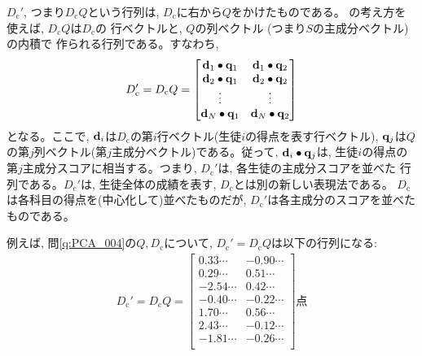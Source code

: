 $D_{\text{c}}'$, つまり$D_{\text{c}}Q$という行列は, 
$D_{\text{c}}$に右から$Q$をかけたものである。
の考え方を使えば, $D_{\text{c}}Q$は$D_{\text{c}}$の
行ベクトルと, $Q$の列ベクトル (つまり$S$の主成分ベクトル)の内積で
作られる行列である。すなわち, 
\begin{eqnarray}
D_{\text{c}}'=D_{\text{c}}Q=\begin{bmatrix}
{\bf d}_1\bullet{\bf q}_1 & {\bf d}_1\bullet{\bf q}_2\\
{\bf d}_2\bullet{\bf q}_1 & {\bf d}_2\bullet{\bf q}_2\\
\vdots & \vdots\\
{\bf d}_N\bullet{\bf q}_1 & {\bf d}_N\bullet{\bf q}_2\\
\end{bmatrix}
\end{eqnarray}
となる。ここで, ${\bf d}_i$は$D_{\text{c}}$の第$i$行ベクトル(生徒$i$の得点を表す行ベクトル), 
${\bf q}_j$は$Q$の第$j$列ベクトル(第$j$主成分ベクトル)である。従って, ${\bf d}_i\bullet{\bf q}_j$は, 
生徒$i$の得点の第$j$主成分スコアに相当する。つまり, $D_{\text{c}}'$は, 各生徒の主成分スコアを並べた
行列である。$D_{\text{c}}'$は, 生徒全体の成績を表す, $D_{\text{c}}$とは別の新しい表現法である。
$D_{\text{c}}$は各科目の得点を(中心化して)並べたものだが, $D_{\text{c}}'$は各主成分のスコアを並べたものである。

例えば, 問\ref{q:PCA_004}の$Q, D_{\text{c}}$について, $D_{\text{c}}'=D_{\text{c}}Q$は以下の行列になる:
\begin{eqnarray}D_{\text{c}}'=D_{\text{c}}Q=\begin{bmatrix}
0.33\cdots  & -0.90\cdots\\
0.29\cdots  & 0.51\cdots\\
-2.54\cdots  & 0.42\cdots\\
-0.40\cdots  & -0.22\cdots\\
1.70\cdots  & 0.56\cdots\\
2.43\cdots  & -0.12\cdots\\
-1.81\cdots  & -0.26\cdots\\
\end{bmatrix}点\label{eq:PCA_001_DQ}\end{eqnarray}

